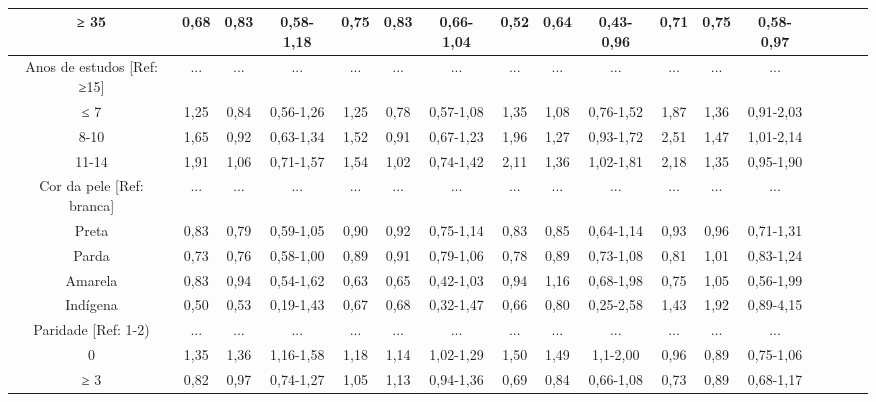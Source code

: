 \documentclass{article}
\begin{document}
\begin{table}
\begin{tabulary}{\linewidth}{ C C C C C C C C C C C C C C C C C }
≥ 35
& 0,68
& 0,83
& 0,58-1,18
& 0,75
& 0,83
& 0,66-1,04
& 0,52
& 0,64
& 0,43-0,96
& 0,71
& 0,75
& 0,58-0,97
\\ \hline

Anos de estudos [Ref: ≥15]
& ...
& ...
& ...
& ...
& ...
& ...
& ...
& ...
& ...
& ...
& ...
& ...
\\ \hline

≤ 7
& 1,25
& 0,84
& 0,56-1,26
& 1,25
& 0,78
& 0,57-1,08
& 1,35
& 1,08
& 0,76-1,52
& 1,87
& 1,36
& 0,91-2,03
\\ \hline

8-10
& 1,65
& 0,92
& 0,63-1,34
& 1,52
& 0,91
& 0,67-1,23
& 1,96
& 1,27
& 0,93-1,72
& 2,51
& 1,47
& 1,01-2,14
\\ \hline

11-14
& 1,91
& 1,06
& 0,71-1,57
& 1,54
& 1,02
& 0,74-1,42
& 2,11
& 1,36
& 1,02-1,81
& 2,18
& 1,35
& 0,95-1,90
\\ \hline

Cor da pele [Ref: branca]
& ...
& ...
& ...
& ...
& ...
& ...
& ...
& ...
& ...
& ...
& ...
& ...
\\ \hline

Preta
& 0,83
& 0,79
& 0,59-1,05
& 0,90
& 0,92
& 0,75-1,14
& 0,83
& 0,85
& 0,64-1,14
& 0,93
& 0,96
& 0,71-1,31
\\ \hline

Parda
& 0,73
& 0,76
& 0,58-1,00
& 0,89
& 0,91
& 0,79-1,06
& 0,78
& 0,89
& 0,73-1,08
& 0,81
& 1,01
& 0,83-1,24
\\ \hline

Amarela
& 0,83
& 0,94
& 0,54-1,62
& 0,63
& 0,65
& 0,42-1,03
& 0,94
& 1,16
& 0,68-1,98
& 0,75
& 1,05
& 0,56-1,99
\\ \hline

Indígena
& 0,50
& 0,53
& 0,19-1,43
& 0,67
& 0,68
& 0,32-1,47
& 0,66
& 0,80
& 0,25-2,58
& 1,43
& 1,92
& 0,89-4,15
\\ \hline

Paridade [Ref: 1-2)
& ...
& ...
& ...
& ...
& ...
& ...
& ...
& ...
& ...
& ...
& ...
& ...
\\ \hline

0
& 1,35
& 1,36
& 1,16-1,58
& 1,18
& 1,14
& 1,02-1,29
& 1,50
& 1,49
& 1,1-2,00
& 0,96
& 0,89
& 0,75-1,06
\\ \hline

≥ 3
& 0,82
& 0,97
& 0,74-1,27
& 1,05
& 1,13
& 0,94-1,36
& 0,69
& 0,84
& 0,66-1,08
& 0,73
& 0,89
& 0,68-1,17
\\ \hline

\end{tabulary}
\caption*{\footnotesize }
\caption{}
\end{table}
\end{document}
